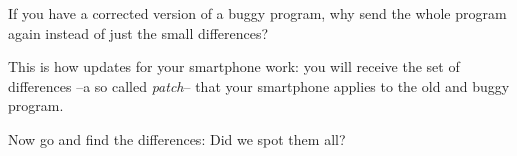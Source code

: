 
If you have a corrected version of a buggy program, why send the whole
program again instead of just the small differences?

This is how updates for your smartphone work: you will receive the
set of differences --a so called \emph{patch}-- that your smartphone applies
to the old and buggy program.

Now go and find the differences: Did we spot them all?

